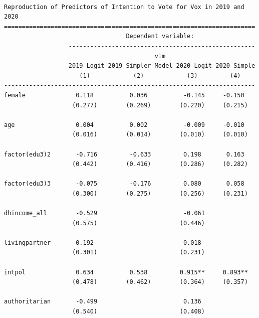 \documentclass[
  letterpaper,
  DIV=11,
  numbers=noendperiod]{scrartcl}
\begin{document}
\begin{verbatim}

Reproduction of Predictors of Intention to Vote for Vox in 2019 and 2020
======================================================================
                                  Dependent variable:                 
                  ----------------------------------------------------
                                          vim                         
                  2019 Logit 2019 Simpler Model 2020 Logit 2020 Simple
                     (1)            (2)            (3)         (4)    
----------------------------------------------------------------------
female              0.118          0.036          -0.145     -0.150   
                   (0.277)        (0.269)        (0.220)     (0.215)  
                                                                      
age                 0.004          0.002          -0.009     -0.010   
                   (0.016)        (0.014)        (0.010)     (0.010)  
                                                                      
factor(edu3)2       -0.716         -0.633         0.198       0.163   
                   (0.442)        (0.416)        (0.286)     (0.282)  
                                                                      
factor(edu3)3       -0.075         -0.176         0.080       0.058   
                   (0.300)        (0.275)        (0.256)     (0.231)  
                                                                      
dhincome_all        -0.529                        -0.061              
                   (0.575)                       (0.446)              
                                                                      
livingpartner       0.192                         0.018               
                   (0.301)                       (0.231)              
                                                                      
intpol              0.634          0.538         0.915**     0.893**  
                   (0.478)        (0.462)        (0.364)     (0.357)  
                                                                      
authoritarian       -0.499                        0.136               
                   (0.540)                       (0.408)              
                                                                      

\end{verbatim}
\end{document}
